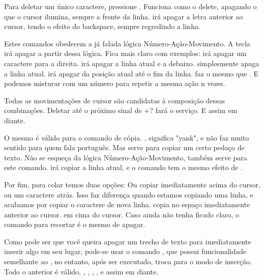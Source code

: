 Para deletar um único caractere, pressione .
Funciona como o delete, apagando o que o cursor ilumina, sempre a frente da linha.
 irá apagar a letra anterior ao cursor, tendo o efeito do backspace, sempre regredindo a linha.

Estes comandos obedecem a já falada lógica Número-Ação-Movimento.
A tecla  irá apagar a partir dessa lógica.
Fica mais claro com exemplos:  irá apagar um caractere para a direita.
 irá apagar a linha atual e a debaixo.
 simplesmente apaga a linha atual.
 irá apagar da posição atual até o fim da linha.
 faz o mesmo que .
E podemos misturar com um número para repetir a mesma ação n vezes.

Todas as movimentações de cursor são candidatas à composição dessas combinações.
Deletar até o próximo sinal de +?  fará o serviço.
E assim em diante.

O mesmo é válido para o comando de cópia.
, significa "yank", e não faz muito sentido para quem fala português.
Mas serve para copiar um certo pedaço de texto.
Não se esqueça da lógica Número-Ação-Movimento, também serve para este comando.
 irá copiar a linha atual, e o comando  tem o mesmo efeito de .

Por fim, para colar temos duas opções: Ou copiar imediatamente acima do cursor, ou um caractere atrás.
Isso faz diferença quando estamos copiando uma linha, e acabamos por copiar o caractere de nova linha.
 copia no espaço imediatamente anterior ao cursor.  em cima do cursor.
Caso ainda não tenha ficado claro, o comando para recortar é o mesmo de apagar.

Como pode ser que você queira apagar um trecho de texto para imediatamente inserir algo em seu lugar,
pode-se usar o comando , que possui funcionalidade semelhante ao ,
no entanto, após ser executado, troca para o modo de inserção.
Todo o anterior é válido, , , , , e assim em diante.

